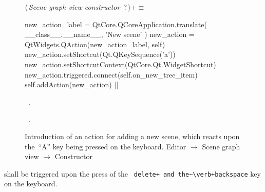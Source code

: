 \documentclass[%
    a4paper,    %
    justified,  %
    nobib,      %
    openany     %
]{tufte-book}
\makeatletter
\renewcommand{\label}[1]{\@tufte@label{##1}}%
\makeatother
\begin{document}
\begin{figure}
\begin{flushleft} \small
\begin{minipage}{\linewidth}\label{scrap47}\raggedright\small
{} $\langle\,${\itshape Scene graph view constructor}\nobreak\ {\footnotesize {?}}$\,\rangle+\equiv$
\vspace{-1ex}
\begin{pythoncode}
    new_action_label = QtCore.QCoreApplication.translate(
        __class__.__name__, 'New scene'
    )
    new_action = QtWidgets.QAction(new_action_label, self)
    new_action.setShortcut(Qt.QKeySequence('a'))
    new_action.setShortcutContext(QtCore.Qt.WidgetShortcut)
    new_action.triggered.connect(self.on_new_tree_item)
    self.addAction(new_action)
|\NWsep|
\end{pythoncode}
\vspace{1.5ex}
\footnotesize
\begin{list}{}{\setlength{\itemsep}{-\parsep}\setlength{\itemindent}{-\leftmargin}}
\item \NWtxtMacroDefBy\ .
\item \NWtxtMacroRefIn\ .

\item{}
\end{list}
\end{minipage}\vspace{4ex}
\end{flushleft}
\caption{Introduction of an action for adding a new scene, which reacts upon
  the~\enquote{A} key being pressed on the keyboard.
  \newline{}\newline{}Editor $\rightarrow$ Scene graph view
  $\rightarrow$ Constructor}
\label{editor:lst:scene-graph-view:constructor:new-action}
\end{figure}

 shall be triggered upon the press of
the ~\verb=delete+ and the~\verb+backspace= key on the keyboard.
\end{document}
